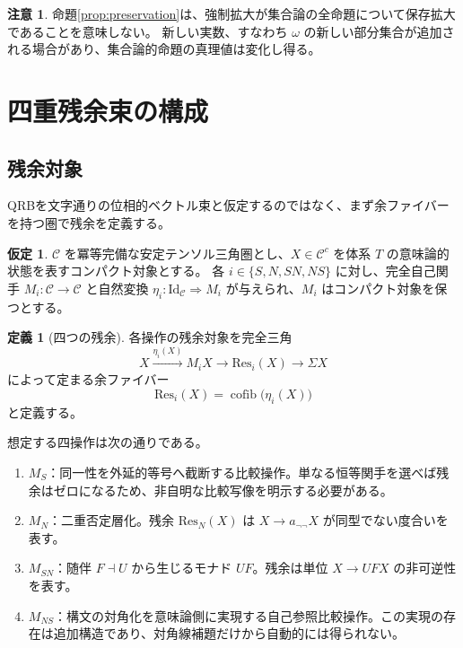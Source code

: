 \documentclass[11pt]{ltjsarticle}
\theoremstyle{plain}
\theoremstyle{definition}
\newtheorem{definition}[theorem]{定義}
\newtheorem{assumption}[theorem]{仮定}
\newtheorem{remark}[theorem]{注意}
\newcommand{\Res}{\mathrm{Res}}
\begin{document}
\begin{remark}
命題\ref{prop:preservation}は、強制拡大が集合論の全命題について保存拡大であることを意味しない。
新しい実数、すなわち \(\omega\) の新しい部分集合が追加される場合があり、集合論的命題の真理値は変化し得る。
\end{remark}

\section{四重残余束の構成}
\label{sec:qrb}

\subsection{残余対象}

QRBを文字通りの位相的ベクトル束と仮定するのではなく、まず余ファイバーを持つ圏で残余を定義する。

\begin{assumption}\label{ass:category}
\(\mathcal{C}\) を冪等完備な安定テンソル三角圏とし、\(X\in\mathcal{C}^c\) を体系 \(T\) の意味論的状態を表すコンパクト対象とする。
各 \(i\in\{S,N,SN,NS\}\) に対し、完全自己関手 \(M_i\colon\mathcal{C}\to\mathcal{C}\) と自然変換
\(\eta_i\colon\mathrm{Id}_{\mathcal{C}}\Rightarrow M_i\) が与えられ、\(M_i\) はコンパクト対象を保つとする。
\end{assumption}

\begin{definition}[四つの残余]
各操作の残余対象を完全三角
\[
X\xrightarrow{\eta_i(X)}M_iX\longrightarrow\Res_i(X)\longrightarrow\Sigma X
\]
によって定まる余ファイバー
\[
\Res_i(X)=\operatorname{cofib}\!\bigl(\eta_i(X)\bigr)
\]
と定義する。
\end{definition}

想定する四操作は次の通りである。
\begin{enumerate}
\item \(M_S\)：同一性を外延的等号へ截断する比較操作。単なる恒等関手を選べば残余はゼロになるため、非自明な比較写像を明示する必要がある。
\item \(M_N\)：二重否定層化。残余 \(\Res_N(X)\) は \(X\to a_{\neg\neg}X\) が同型でない度合いを表す。
\item \(M_{SN}\)：随伴 \(F\dashv U\) から生じるモナド \(UF\)。残余は単位 \(X\to UFX\) の非可逆性を表す。
\item \(M_{NS}\)：構文の対角化を意味論側に実現する自己参照比較操作。この実現の存在は追加構造であり、対角線補題だけから自動的には得られない。
\end{enumerate}
\end{document}
